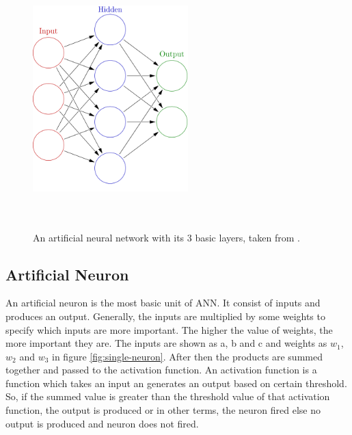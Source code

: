 \begin{figure}[htpb]
	\centering
	\includegraphics[width=6cm,height=10cm,keepaspectratio=true]{images/neural-net}
	\caption{
		An artificial neural network with its 3 basic layers, taken from \cite{wiki:ann}.
	}
	\label{fig:wiki:ann}
\end{figure}


\subsection{Artificial Neuron}
An artificial neuron is the most basic unit of ANN. It consist of inputs and produces an output. Generally, the inputs are multiplied by some weights to specify which inputs are more important. The higher the value of weights, the more important they are. The inputs are shown as a, b and c and weights as $w_1$, $w_2$ and $w_3$ in figure \ref{fig:single-neuron}. After then the products are summed together and passed to the activation function. An activation function is a function which takes an input an generates an output based on certain threshold. So, if the summed value is greater than the threshold value of that activation function, the output is produced or in other terms, the neuron fired else no output is produced and neuron does not fired.

